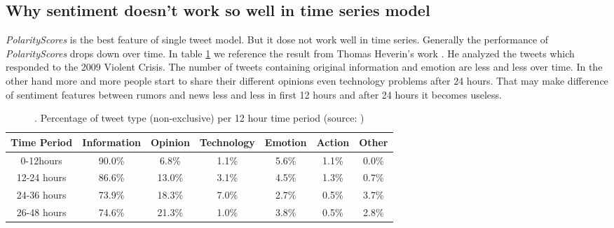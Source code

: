  \subsection{Why sentiment doesn't work so well in time series model}
 \emph{PolarityScores} is the best feature of single tweet model. But it dose not work well in time series. Generally   the performance of \emph{PolarityScores} drops down over time. 
  In table \ref{Percentage-of-tweet-type} we reference the result from Thomas Heverin's work \cite{heverin2010microblogging}. He analyzed the tweets which responded to the 2009 Violent Crisis. The number of tweets containing original information and emotion are less and less over time. In the other hand more and more people start to share their different opinions even technology problems after 24 hours. That may make difference of sentiment features between rumors and news less and less in first 12 hours and after 24 hours it becomes useless. 
\begin{table}[!h]
\centering
\begin{tabular}{ccccccc}
\hline

\multicolumn{1}{|c|}{\small{Time Period}} & \multicolumn{1}{c|}{\small{Information}} & \multicolumn{1}{c|}{\small{Opinion}} & \multicolumn{1}{c|}{\small{Technology}} & \multicolumn{1}{c|}{\small{Emotion}} & \multicolumn{1}{c|}{\small{Action}} & \multicolumn{1}{c|}{\small{Other}} \\ \hline
\multicolumn{1}{|c|}{\small{0-12hours}}   & \multicolumn{1}{c|}{90.0\%}           & \multicolumn{1}{c|}{6.8\%}        & \multicolumn{1}{c|}{1.1\%}           & \multicolumn{1}{c|}{5.6\%}        & \multicolumn{1}{c|}{1.1\%}       & \multicolumn{1}{c|}{0.0\%}      \\ \hline
\multicolumn{1}{|c|}{\small{12-24 hours}} & \multicolumn{1}{c|}{86.6\%}           & \multicolumn{1}{c|}{13.0\%}       & \multicolumn{1}{c|}{3.1\%}           & \multicolumn{1}{c|}{4.5\%}        & \multicolumn{1}{c|}{1.3\%}       & \multicolumn{1}{c|}{0.7\%}      \\ \hline
\multicolumn{1}{|c|}{\small{24-36 hours}} & \multicolumn{1}{c|}{73.9\%}           & \multicolumn{1}{c|}{18.3\%}       & \multicolumn{1}{c|}{7.0\%}           & \multicolumn{1}{c|}{2.7\%}        & \multicolumn{1}{c|}{0.5\%}       & \multicolumn{1}{c|}{3.7\%}      \\ \hline
\multicolumn{1}{|c|}{\small{26-48 hours}} & \multicolumn{1}{c|}{74.6\%}           & \multicolumn{1}{c|}{21.3\%}       & \multicolumn{1}{c|}{1.0\%}           & \multicolumn{1}{c|}{3.8\%}        & \multicolumn{1}{c|}{0.5\%}       & \multicolumn{1}{c|}{2.8\%}      \\ \hline

\end{tabular}
   \caption{. Percentage of tweet type (non-exclusive) per 12 hour time period (source: \cite{heverin2010microblogging})}
\label{Percentage-of-tweet-type}

\end{table}


